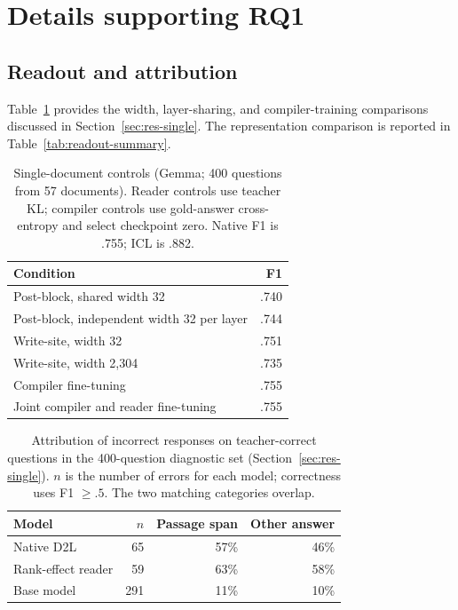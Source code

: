 \section{Details supporting RQ1}
\label{sec:single-tables}
\subsection{Readout and attribution}
Table~\ref{tab:reader-ablations} provides the width, layer-sharing, and
compiler-training comparisons discussed in Section~\ref{sec:res-single}.
The representation comparison is reported in Table~\ref{tab:readout-summary}.

\begin{table}[t]
\centering
\caption{Single-document controls (Gemma; 400 questions from 57 documents).
Reader controls use teacher KL; compiler controls use gold-answer
cross-entropy and select checkpoint zero. Native F1 is .755; ICL is .882.}
\label{tab:reader-ablations}
\small\setlength{\tabcolsep}{3pt}
\begin{tabular}{@{}lr@{}}
\toprule
Condition & F1 \\
\midrule
Post-block, shared width 32 & .740 \\
Post-block, independent width 32 per layer & .744 \\
Write-site, width 32 & .751 \\
Write-site, width 2,304 & .735 \\
Compiler fine-tuning & .755 \\
Joint compiler and reader fine-tuning & .755 \\
\bottomrule
\end{tabular}
\end{table}

\begin{table}[t]
\centering
\caption{Attribution of incorrect responses on teacher-correct questions
in the 400-question diagnostic set (Section~\ref{sec:res-single}).
$n$ is the number of errors for each model; correctness uses F1 $\geq .5$.
The two matching categories overlap.}
\label{tab:fact-attribution}
\small\setlength{\tabcolsep}{3pt}
\begin{tabular}{@{}lrrr@{}}
\toprule
Model & $n$ & Passage span & Other answer \\
\midrule
Native D2L & 65 & 57\% & 46\% \\
Rank-effect reader & 59 & 63\% & 58\% \\
Base model & 291 & 11\% & 10\% \\
\bottomrule
\end{tabular}
\end{table}

